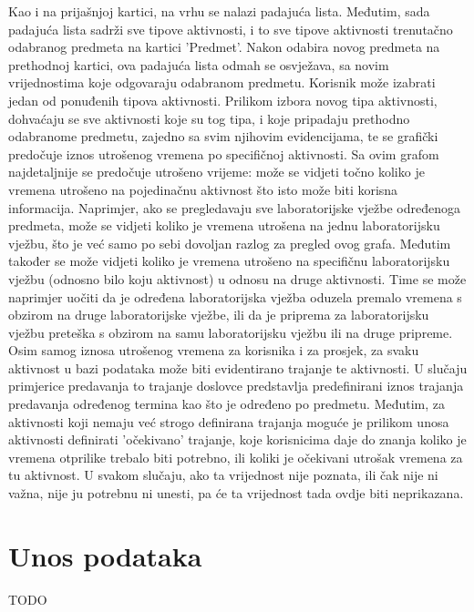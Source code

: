 \documentclass[times, utf8, zavrsni]{fer}
\begin{document}
Kao i na prijašnjoj kartici, na vrhu se nalazi padajuća lista. Međutim, sada padajuća lista sadrži sve tipove aktivnosti, i to sve tipove aktivnosti trenutačno odabranog predmeta na kartici 'Predmet'. Nakon odabira novog predmeta na prethodnoj kartici, ova padajuća lista odmah se osvježava, sa novim vrijednostima koje odgovaraju odabranom predmetu. Korisnik može izabrati jedan od ponuđenih tipova aktivnosti. Prilikom izbora novog tipa aktivnosti, dohvaćaju se sve aktivnosti koje su tog tipa, i koje pripadaju prethodno odabranome predmetu, zajedno sa svim njihovim evidencijama, te se grafički predočuje iznos utrošenog vremena po specifičnoj aktivnosti. Sa ovim grafom najdetaljnije se predočuje utrošeno vrijeme: može se vidjeti točno koliko je vremena utrošeno na pojedinačnu aktivnost što isto može biti korisna informacija. Naprimjer, ako se pregledavaju sve laboratorijske vježbe određenoga predmeta, može se vidjeti koliko je vremena utrošena na jednu laboratorijsku vježbu, što je već samo po sebi dovoljan razlog za pregled ovog grafa. Međutim također se može vidjeti koliko je vremena utrošeno na specifičnu laboratorijsku vježbu (odnosno bilo koju aktivnost) u odnosu na druge aktivnosti. Time se može naprimjer uočiti da je određena laboratorijska vježba oduzela premalo vremena s obzirom na druge laboratorijske vježbe, ili da je priprema za laboratorijsku vježbu preteška s obzirom na samu laboratorijsku vježbu ili na druge pripreme.\\

Osim samog iznosa utrošenog vremena za korisnika i za prosjek, za svaku aktivnost u bazi podataka može biti evidentirano trajanje te aktivnosti. U slučaju primjerice predavanja to trajanje doslovce predstavlja predefinirani iznos trajanja predavanja određenog termina kao što je određeno po predmetu. Međutim, za aktivnosti koji nemaju već strogo definirana trajanja moguće je prilikom unosa aktivnosti definirati 'očekivano' trajanje, koje korisnicima daje do znanja koliko je vremena otprilike trebalo biti potrebno, ili koliki je očekivani utrošak vremena za tu aktivnost. U svakom slučaju, ako ta vrijednost nije poznata, ili čak nije ni važna, nije ju potrebnu ni unesti, pa će ta vrijednost tada ovdje biti neprikazana.\\

\section{Unos podataka}

TODO
\end{document}
